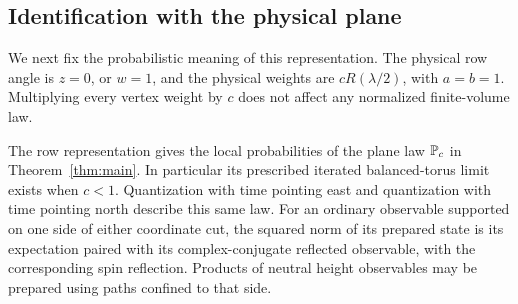 \subsection{Identification with the physical plane}

We next fix the probabilistic meaning of this representation.  The
physical row angle is $z=0$, or $w=1$, and the physical weights are
$cR(\lambda/2)$, with $a=b=1$.  Multiplying every vertex weight by $c$
does not affect any normalized finite-volume law.

\begin{proposition}
\label{prop:physical-plane}
The row representation gives the local probabilities of the plane law
$\P_c$ in Theorem~\ref{thm:main}.  In particular its prescribed iterated
balanced-torus limit exists when $c<1$.  Quantization with time pointing
east and quantization with time pointing north describe this same law.
For an ordinary observable supported on one side of either coordinate
cut, the squared norm of its prepared state is its expectation paired
with its complex-conjugate reflected observable, with the corresponding
spin reflection.  Products of neutral height observables may be prepared
using paths confined to that side.
\end{proposition}

